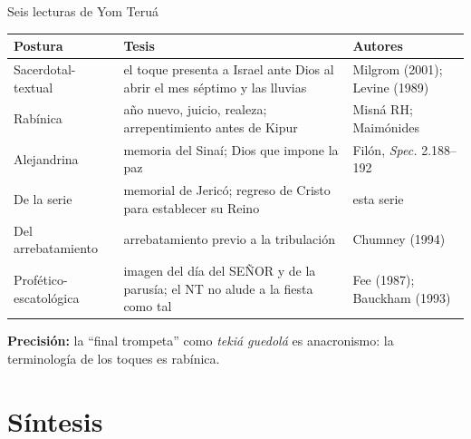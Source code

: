\documentclass[hyperref={bookmarks=false},aspectratio=169]{beamer}
\newcommand{\SENOR}{S{\fontsize{0.78em}{1em}\selectfont EÑOR}}
\newcommand{\precision}[1]{{\footnotesize\color{sepia}\textbf{Precisión:} #1}}
\begin{document}
\begin{frame}{Seis lecturas de Yom Teruá}
\renewcommand{\arraystretch}{1.1}\scriptsize
\begin{tabular}{@{}L{2.4cm}L{5.6cm}L{3.6cm}@{}}
\toprule
\textbf{Postura} & \textbf{Tesis} & \textbf{Autores} \\ \midrule
Sacerdotal-textual & el toque presenta a Israel ante Dios al abrir el mes séptimo y las lluvias & Milgrom (2001); Levine (1989) \\
Rabínica & año nuevo, juicio, realeza; arrepentimiento antes de Kipur & Misná RH; Maimónides \\
Alejandrina & memoria del Sinaí; Dios que impone la paz & Filón, \emph{Spec.} 2.188--192 \\
De la serie & memorial de Jericó; regreso de Cristo para establecer su Reino & esta serie \\
Del arrebatamiento & arrebatamiento previo a la tribulación & Chumney (1994) \\
Profético-escatológica & imagen del día del \SENOR{} y de la parusía; el NT no alude a la fiesta como tal & Fee (1987); Bauckham (1993) \\
\bottomrule
\end{tabular}\par\medskip
\precision{la ``final trompeta'' como \emph{tekiá guedolá} es anacronismo: la terminología de los toques es rabínica.}
\end{frame}

\section{Síntesis}
\end{document}

